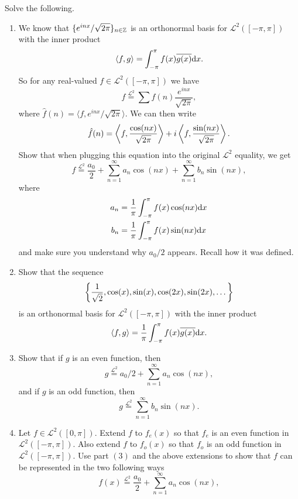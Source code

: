 \documentclass[11pt,a4paper]{article}
\begin{document}
\begin{exercise} 
  Solve the following.
  \begin{enumerate}
    \item[(1)] We know that $\{e^{i n x} / \sqrt{2\pi}\}_{n \in \mathbb{Z}}$
      is an orthonormal basis for $\mathcal L^2([-\pi,\pi])$ with the inner product
      \[
        \ip{f}{g} =
        \int_{-\pi}^{\pi} f(x) \overline{g(x)} \dx.
      \]
      So for any real-valued $f \in \mathcal L^2([-\pi,\pi])$ we have
      \[
        f \overset{\mathcal L^2}{=} \sum \hat f(n) \frac{e^{i n x}}{\sqrt{2\pi}},
      \]
      where $\hat f(n) = \langle f,e^{i n x} / \sqrt{2\pi}\rangle$.
      We can then write
      \[
        \hat f(n) =
        \left\langle f, \frac{\cos(n x)}{\sqrt{2\pi}} \right\rangle +
        i \left\langle f, \frac{\sin(n x)}{\sqrt{2\pi}} \right\rangle.
      \]
      Show that when plugging this equation into the original $\mathcal L^2$
      equality, we get
      \[
        f \overset{\mathcal L^2}{=}
        \frac{a_0}{2} +
        \sum_{n=1}^{\infty} a_n \cos(nx) + \sum_{n=1}^{\infty} b_n \sin(nx),
      \]
      where
      \begin{align*}
        a_n &= \frac{1}{\pi} \int_{-\pi}^{\pi} f(x) \cos(nx) \dx \\
        b_n &= \frac{1}{\pi} \int_{-\pi}^{\pi} f(x) \sin(nx) \dx
      \end{align*}
      and make sure you understand why $a_0/2$ appears.
      Recall how it was defined.
    \item[(2)] Show that the sequence
      \[
        \left\{\frac{1}{\sqrt{2}}, \cos(x), \sin(x), \cos(2x), \sin(2x),\dots\right\}
      \]
      is an orthonormal basis for $\mathcal L^2([-\pi,\pi])$ with the inner product
      \[
        \ip{f}{g} =
        \frac{1}{\pi} \int_{-\pi}^{\pi} f(x) \overline{g(x)} \dx.
      \]
    \item[(3)] Show that if $g$ is an even function,
      then
      \[
        g \overset{\mathcal L^2}{=} a_0/2 + \sum_{n=1}^{\infty} a_n \cos(nx),
      \]
      and if $g$ is an odd function, then
      \[
        g \overset{\mathcal L^2}{=} \sum_{n=1}^{\infty} b_n \sin(nx).
      \]
    \item[(4)] Let $f \in \mathcal L^2([0,\pi])$.
      Extend $f$ to $f_e(x)$ so that $f_e$ is an even function
      in $\mathcal L^2([-\pi,\pi])$.
      Also extend $f$ to $f_o(x)$ so that $f_o$ is an odd function
      in $\mathcal L^2([-\pi,\pi])$.
      Use part $(3)$ and the above extensions to show that $f$ can be
      represented in the two following ways
      \[
        f(x) \overset{\mathcal L^2}{=} \frac{a_0}{2} + \sum_{n=1}^{\infty} a_n \cos(nx),
\]
\end{enumerate}
\end{exercise}
\end{document}
